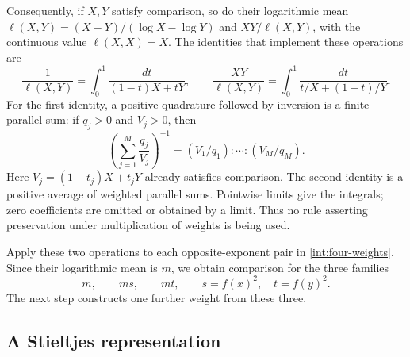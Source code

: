 \documentclass[11pt]{article}
\theoremstyle{remark}\newtheorem{remark}[theorem]{Remark}
\begin{document}
Consequently, if $X,Y$ satisfy comparison, so do their logarithmic mean
$\ell(X,Y)=(X-Y)/(\log X-\log Y)$ and $XY/\ell(X,Y)$,
with the continuous value $\ell(X,X)=X$.
The identities that implement these operations are
\begin{equation}\label{int:log-means}
 \frac1{\ell(X,Y)}=\int_0^1\frac{dt}{(1-t)X+tY},
 \qquad
 \frac{XY}{\ell(X,Y)}=\int_0^1\frac{dt}{t/X+(1-t)/Y}.
\end{equation}
For the first identity, a positive quadrature followed by inversion
is a finite parallel sum: if $q_j>0$ and $V_j>0$, then
\[
 \left(\sum_{j=1}^M\frac{q_j}{V_j}\right)^{-1}
 = (V_1/q_1):\cdots:(V_M/q_M).
\]
Here $V_j=(1-t_j)X+t_jY$ already satisfies comparison. The second
identity is a positive average of weighted parallel sums.  Pointwise limits give the integrals; zero coefficients
are omitted or obtained by a limit.  Thus no rule asserting preservation
under multiplication of weights is being used.

Apply these two operations to each opposite-exponent pair in
\eqref{int:four-weights}.  Since their logarithmic mean is $m$, we obtain
comparison for the three families
\begin{equation}\label{int:basic-weights}
 m,\qquad ms,\qquad mt,
 \qquad s=f(x)^2,\quad t=f(y)^2.
\end{equation}
The next step constructs one further weight from these three.

\subsection{A Stieltjes representation}
\end{document}

